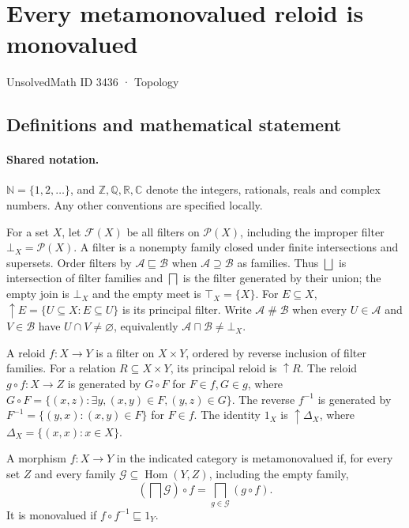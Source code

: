 \documentclass[11pt]{article}
\begin{document}
\setcounter{section}{3435}
\section{Every metamonovalued reloid is monovalued}\label{3436}
{\small\sffamily UnsolvedMath ID 3436 · Topology}
\subsection{Definitions and mathematical statement}

\paragraph{Shared notation.}$\mathbb N=\{1,2,\ldots\}$, and $\mathbb Z,\mathbb Q,\mathbb R,\mathbb C$ denote the integers, rationals, reals and complex numbers. Any other conventions are specified locally.


For a set $X$, let $\mathcal F(X)$ be all filters on $\mathcal P(X)$, including the improper filter $\bot_X=\mathcal P(X)$. A filter is a nonempty family closed under finite intersections and supersets. Order filters by $\mathcal A\sqsubseteq\mathcal B$ when $\mathcal A\supseteq\mathcal B$ as families. Thus $\bigsqcup$ is intersection of filter families and $\bigsqcap$ is the filter generated by their union; the empty join is $\bot_X$ and the empty meet is $\top_X=\{X\}$. For $E\subseteq X$, $\uparrow E=\{U\subseteq X:E\subseteq U\}$ is its principal filter. Write $\mathcal A\mathrel{\#}\mathcal B$ when every $U\in\mathcal A$ and $V\in\mathcal B$ have $U\cap V\ne\varnothing$, equivalently $\mathcal A\sqcap\mathcal B\ne\bot_X$.

A reloid $f:X\to Y$ is a filter on $X\times Y$, ordered by reverse inclusion of filter families. For a relation $R\subseteq X\times Y$, its principal reloid is $\uparrow R$. The reloid $g\circ f:X\to Z$ is generated by $G\circ F$ for $F\in f,G\in g$, where $G\circ F=\{(x,z):\exists y,(x,y)\in F,(y,z)\in G\}$. The reverse $f^{-1}$ is generated by $F^{-1}=\{(y,x):(x,y)\in F\}$ for $F\in f$. The identity $1_X$ is $\uparrow\Delta_X$, where $\Delta_X=\{(x,x):x\in X\}$.

A morphism $f:X\to Y$ in the indicated category is metamonovalued if, for every set $Z$ and every family $\mathcal G\subseteq\operatorname{Hom}(Y,Z)$, including the empty family,
\[
 \left(\bigsqcap\mathcal G\right)\circ f
 =\bigsqcap_{g\in\mathcal G}(g\circ f).
\]
It is monovalued if $f\circ f^{-1}\sqsubseteq1_Y$.
\end{document}
